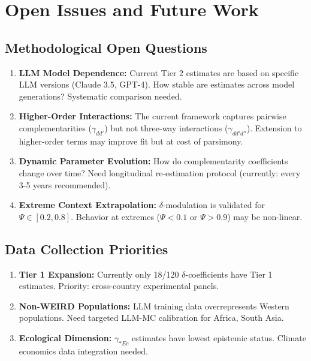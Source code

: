 \documentclass[11pt,a4paper]{article}
\theoremstyle{definition}
\begin{document}

\section{Open Issues and Future Work}
\label{sec:bbb-open-issues}

\subsection{Methodological Open Questions}

\begin{enumerate}
    \item \textbf{LLM Model Dependence:}
    Current Tier 2 estimates are based on specific LLM versions (Claude 3.5, GPT-4).
    How stable are estimates across model generations? Systematic comparison needed.
    
    \item \textbf{Higher-Order Interactions:}
    The current framework captures pairwise complementarities ($\gamma_{dd'}$) but not 
    three-way interactions ($\gamma_{dd'd''}$). Extension to higher-order terms may 
    improve fit but at cost of parsimony.
    
    \item \textbf{Dynamic Parameter Evolution:}
    How do complementarity coefficients change over time? Need longitudinal 
    re-estimation protocol (currently: every 3-5 years recommended).
    
    \item \textbf{Extreme Context Extrapolation:}
    $\delta$-modulation is validated for $\Psi \in [0.2, 0.8]$. Behavior at 
    extremes ($\Psi < 0.1$ or $\Psi > 0.9$) may be non-linear.
\end{enumerate}

\subsection{Data Collection Priorities}

\begin{enumerate}
    \item \textbf{Tier 1 Expansion:} Currently only 18/120 $\delta$-coefficients 
    have Tier 1 estimates. Priority: cross-country experimental panels.
    
    \item \textbf{Non-WEIRD Populations:} LLM training data overrepresents 
    Western populations. Need targeted LLM-MC calibration for Africa, South Asia.
    
    \item \textbf{Ecological Dimension:} $\gamma_{*Ec}$ estimates have lowest 
    epistemic status. Climate economics data integration needed.
\end{enumerate}
\end{document}
